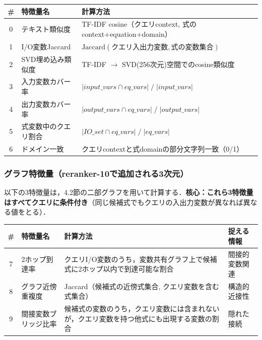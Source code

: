 \documentclass[11pt,a4paper]{ltjsarticle}
\begin{document}
\begin{table}[h]
\centering
\begin{tabular}{clp{8cm}}
\toprule
\# & 特徴量名 & 計算方法 \\
\midrule
0 & テキスト類似度 & TF-IDF cosine（クエリcontext, 式のcontext+equation+domain） \\
1 & I/O変数Jaccard & $\mathrm{Jaccard}(\text{クエリ入出力変数}, \text{式の変数集合})$ \\
2 & SVD埋め込み類似度 & TF-IDF $\to$ SVD(256次元)空間でのcosine類似度 \\
3 & 入力変数カバー率 & $|\mathit{input\_vars} \cap \mathit{eq\_vars}| \;/\; |\mathit{input\_vars}|$ \\
4 & 出力変数カバー率 & $|\mathit{output\_vars} \cap \mathit{eq\_vars}| \;/\; |\mathit{output\_vars}|$ \\
5 & 式変数中のクエリ割合 & $|\mathit{IO\_set} \cap \mathit{eq\_vars}| \;/\; |\mathit{eq\_vars}|$ \\
6 & ドメイン一致 & クエリcontextと式domainの部分文字列一致（0/1） \\
\bottomrule
\end{tabular}
\end{table}

\subsubsection{グラフ特徴量（reranker-10で追加される3次元）}

以下の3特徴量は，4.2節の二部グラフを用いて計算する．\textbf{核心：これら3特徴量はすべてクエリに条件付き}（同じ候補式でもクエリの入出力変数が異なれば異なる値をとる）．

\begin{table}[h]
\centering
\begin{tabular}{clp{5.5cm}l}
\toprule
\# & 特徴量名 & 計算方法 & 捉える情報 \\
\midrule
7 & 2ホップ到達率 & クエリI/O変数のうち，変数共有グラフ上で候補式に2ホップ以内で到達可能な割合 & 間接的変数関連 \\
8 & グラフ近傍重複度 & Jaccard（候補式の近傍式集合, クエリ変数を含む式集合） & 構造的近接性 \\
9 & 間接変数ブリッジ比率 & 候補式の変数のうち，クエリ変数には含まれないが，クエリ変数を持つ他式にも出現する変数の割合 & 隠れた接続 \\
\bottomrule
\end{tabular}
\end{table}
\end{document}
